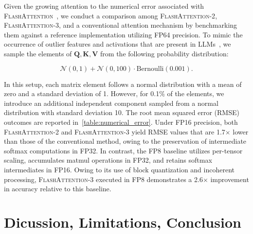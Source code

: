 \begin{enumerate}
Given the growing attention to the numerical error associated with \textsc{FlashAttention}~\citep{golden2024flash}, we conduct a comparison among \textsc{FlashAttention-2}, \textsc{FlashAttention-3}, and a conventional attention mechanism by benchmarking them against a reference implementation utilizing FP64 precision. To mimic the occurrence of outlier features and activations that are present in LLMs~\citep{dettmers2208llm, sun2024massive}, we sample the elements of $\mathbf{Q}, \mathbf{K}, \mathbf{V}$ from the following probability distribution:

\begin{equation*}
  \mathcal{N}(0, 1) + \mathcal{N}(0, 100) \cdot \mathrm{Bernoulli}(0.001).
\end{equation*}

In this setup, each matrix element follows a normal distribution with a mean of zero and a standard deviation of 1. However, for 0.1\% of the elements, we introduce an additional independent component sampled from a normal distribution with standard deviation 10. The root mean squared error (RMSE) outcomes are reported in~\cref{table:numerical_error}. Under FP16 precision, both \textsc{FlashAttention-2} and \textsc{FlashAttention-3} yield RMSE values that are 1.7$\times$ lower than those of the conventional method, owing to the preservation of intermediate softmax computations in FP32. In contrast, the FP8 baseline utilizes per-tensor scaling, accumulates matmul operations in FP32, and retains softmax intermediates in FP16. Owing to its use of block quantization and incoherent processing, \textsc{FlashAttention-3} executed in FP8 demonstrates a 2.6$\times$ improvement in accuracy relative to this baseline.

\section{Dicussion, Limitations, Conclusion}
\label{sec:discussion}


\end{enumerate}
